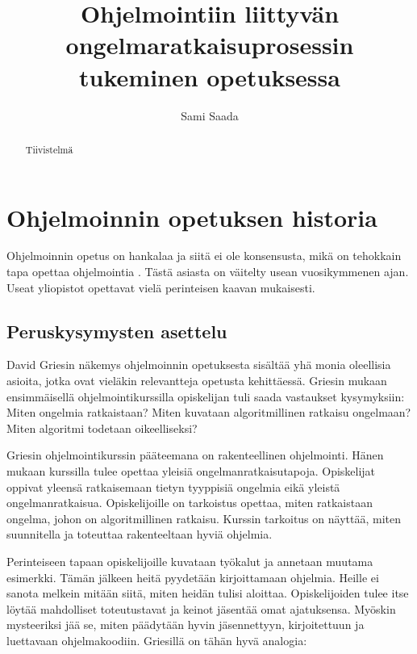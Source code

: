 \documentclass{tktltiki}
\begin{document}
\author{Sami Saada}
\title{Ohjelmointiin liittyvän ongelmaratkaisuprosessin tukeminen opetuksessa}

\maketitle

\doublespacing

\subject{Tietojenkäsittelytiede}


\begin{abstract}
Tiivistelmä
\end{abstract}

\mytableofcontents

\section{Ohjelmoinnin opetuksen historia}

Ohjelmoinnin opetus on hankalaa ja siitä ei ole konsensusta, mikä on tehokkain tapa opettaa ohjelmointia \cite{Vihavainen:2011:EAM:1953163.1953196}. Tästä asiasta on väitelty usean vuosikymmenen ajan. Useat yliopistot opettavat vielä perinteisen kaavan mukaisesti.

\subsection{Peruskysymysten asettelu}

David Griesin \cite{Gries:1974:WTI:953057.810447} näkemys ohjelmoinnin opetuksesta sisältää yhä monia oleellisia asioita, jotka ovat vieläkin relevantteja opetusta kehittäessä. Griesin mukaan ensimmäisellä ohjelmointikurssilla opiskelijan tuli saada vastaukset kysymyksiin: Miten ongelmia ratkaistaan? Miten kuvataan algoritmillinen ratkaisu ongelmaan? Miten algoritmi todetaan oikeelliseksi?

Griesin ohjelmointikurssin pääteemana on rakenteellinen ohjelmointi. Hänen mukaan kurssilla tulee opettaa yleisiä ongelmanratkaisutapoja. Opiskelijat oppivat yleensä ratkaisemaan tietyn tyyppisiä ongelmia eikä yleistä ongelmanratkaisua. Opiskelijoille on tarkoistus opettaa, miten ratkaistaan ongelma, johon on algoritmillinen ratkaisu. Kurssin tarkoitus on näyttää, miten suunnitella ja toteuttaa rakenteeltaan hyviä ohjelmia.

Perinteiseen tapaan opiskelijoille kuvataan työkalut ja annetaan muutama esimerkki. Tämän jälkeen heitä pyydetään kirjoittamaan ohjelmia. Heille ei sanota melkein mitään siitä, miten heidän tulisi aloittaa. Opiskelijoiden tulee itse löytää mahdolliset toteutustavat ja keinot jäsentää omat ajatuksensa. Myöskin mysteeriksi jää se, miten päädytään hyvin jäsennettyyn, kirjoitettuun ja luettavaan ohjelmakoodiin. Griesillä on tähän hyvä analogia:
\end{document}
